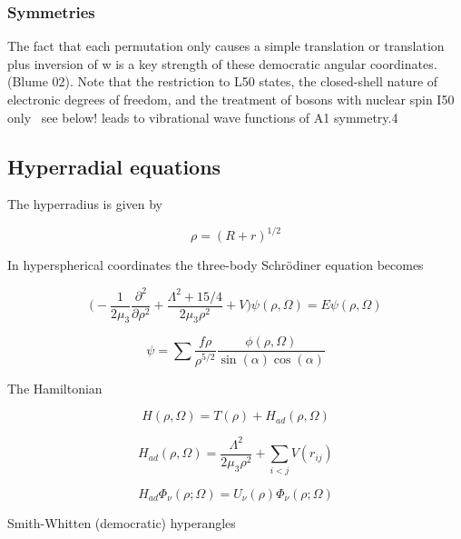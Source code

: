 \documentclass{article}
\begin{document}
\subsubsection{Symmetries}

The fact that each permutation only causes a
simple translation or translation plus inversion of w is a key
strength of these democratic angular coordinates.(Blume 02). Note that
the restriction to L50 states, the closed-shell nature of electronic
degrees of freedom, and the treatment of bosons with
nuclear spin I50 only ~see below! leads to vibrational wave
functions of A1 symmetry.4


\subsection{Hyperradial equations}

The hyperradius is given by

\begin{equation}
\rho = (R + r)^{1/2}
\end{equation}

In hyperspherical coordinates the three-body Schr{\"o}diner equation becomes

\begin{equation}
\Bigg(-\frac{1}{2 \mu_{3}}\frac{\partial^2}{ \partial \rho^2} + \frac{\Lambda^2 + 15/4}{2 \mu_{3} \rho^2} + V \Bigg)\psi(\rho,\Omega) = E\psi(\rho,\Omega)
\end{equation}

\begin{equation}
\psi = \sum \frac{f{\rho}}{\rho^{5/2}} \frac{\phi{(\rho,\Omega)}}{\sin(\alpha) \cos(\alpha)}
\end{equation}

The Hamiltonian

\begin{equation}
H(\rho,\Omega) = T(\rho) + H_{ad}(\rho,\Omega)
\end{equation}

\begin{equation}
H_{ad}(\rho,\Omega) = \frac{\Lambda^2}{2 \mu_{3} \rho^2} + \sum_{i<j} V(r_{ij})
\end{equation}

\begin{equation}
H_{ad} \Phi_{\nu}{(\rho ; \Omega)}= U_{\nu}{(\rho)} \Phi_{\nu}{(\rho ; \Omega)}
\end{equation}


Smith-Whitten (democratic) hyperangles
\end{document}
